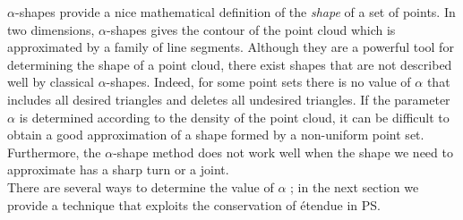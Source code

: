$\alpha$-shapes provide a nice mathematical definition of the \textit{shape} of
a set of points. In two dimensions, $\alpha$-shapes gives the contour of the point cloud which is approximated by a family of line segments. 
Although they are a powerful tool for determining the shape of a point cloud, there exist shapes that are not described well by classical $ \alpha $-shapes. Indeed, for some point sets there is no value of $\alpha$ that includes all desired triangles and deletes all undesired triangles. If the parameter $\alpha$ is determined according to the density of the point cloud, it can be difficult to obtain a good approximation of a shape formed by a non-uniform point set. Furthermore, the $\alpha$-shape method does not work well when the shape we need to approximate has a sharp turn or a joint. 
\\ \indent There are several ways to determine the value of $\alpha$ \cite{mandal1997selection}; in the next section we provide a technique that exploits the conservation of \'{e}tendue in PS. 
